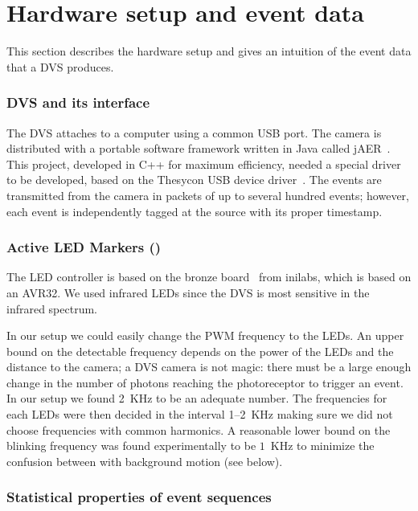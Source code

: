 \vfill\pagebreak


\section{Hardware setup and event data\label{sec:Hardware-setup-and}}

This section describes the hardware setup and gives an intuition of
the event data that a DVS produces.


\subsubsection{DVS and its interface\label{sec:interface}}

The DVS attaches to a computer using a common USB port. The camera
is distributed with a portable software framework written in Java
called jAER~\cite{jaer}. This project, developed in C++ for maximum
efficiency, needed a special driver to be developed, based on the
Thesycon USB device driver~\cite{thesycon}. The events are transmitted
from the camera in packets of up to several hundred events; however,
each event is independently tagged at the source with its proper timestamp.



\subsubsection{Active LED Markers (\ALMs)\label{sec:leds}}

The LED controller is based on the bronze board~\cite{bronzeboard}
from inilabs, which is based on an AVR32.  We used infrared LEDs
since the DVS is most sensitive in the infrared spectrum. 



In our setup we could easily change the PWM frequency to the LEDs.
An upper bound on the detectable frequency depends on the power of
the LEDs and the distance to the camera; a DVS camera is not magic:
there must be a large enough change in the number of photons reaching
the photoreceptor to trigger an event. In our setup we found 2~KHz
to be an adequate number. The frequencies for each LEDs were then
decided in the interval 1--2~KHz making sure we did not choose frequencies
with common harmonics. A reasonable lower bound on the blinking frequency
was found experimentally to be $1$~KHz to minimize the confusion
between with background motion (see 
below).


\subsubsection{Statistical properties of event sequences}

